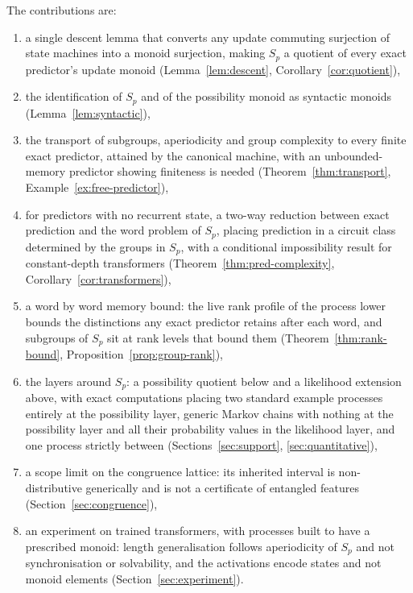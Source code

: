 \documentclass[10pt]{article}
\theoremstyle{definition}
\theoremstyle{remark}
\begin{document}
The contributions are:
\begin{enumerate}[label=(\alph*)]
  \item a single descent lemma that converts any update commuting
        surjection of state machines into a monoid surjection, making
        $S_p$ a quotient of every exact predictor's update monoid
        (Lemma~\ref{lem:descent}, Corollary~\ref{cor:quotient}),
  \item the identification of $S_p$ and of the possibility monoid as
        syntactic monoids (Lemma~\ref{lem:syntactic}),
  \item the transport of subgroups, aperiodicity and group complexity
        to every finite exact predictor, attained by the canonical
        machine, with an unbounded-memory predictor showing
        finiteness is needed (Theorem~\ref{thm:transport},
        Example~\ref{ex:free-predictor}),
  \item for predictors with no recurrent state, a two-way reduction
        between exact prediction and the word problem of $S_p$,
        placing prediction in a circuit class determined by the
        groups in $S_p$, with a conditional impossibility result for
        constant-depth transformers
        (Theorem~\ref{thm:pred-complexity},
        Corollary~\ref{cor:transformers}),
  \item a word by word memory bound: the live rank profile of the
        process lower bounds the distinctions any exact predictor
        retains after each word, and subgroups of $S_p$ sit at rank
        levels that bound them (Theorem~\ref{thm:rank-bound},
        Proposition~\ref{prop:group-rank}),
  \item the layers around $S_p$: a possibility quotient below and a
        likelihood extension above, with exact computations placing
        two standard example processes entirely at the possibility
        layer, generic Markov chains with nothing at the possibility
        layer and all their probability values in the likelihood
        layer, and one process strictly between
        (Sections~\ref{sec:support}, \ref{sec:quantitative}),
  \item a scope limit on the congruence lattice: its inherited
        interval is non-distributive generically and is not a
        certificate of entangled features
        (Section~\ref{sec:congruence}),
  \item an experiment on trained transformers, with processes built
        to have a prescribed monoid: length generalisation follows
        aperiodicity of $S_p$ and not synchronisation or solvability,
        and the activations encode states and not monoid elements
        (Section~\ref{sec:experiment}).
\end{enumerate}
\end{document}
